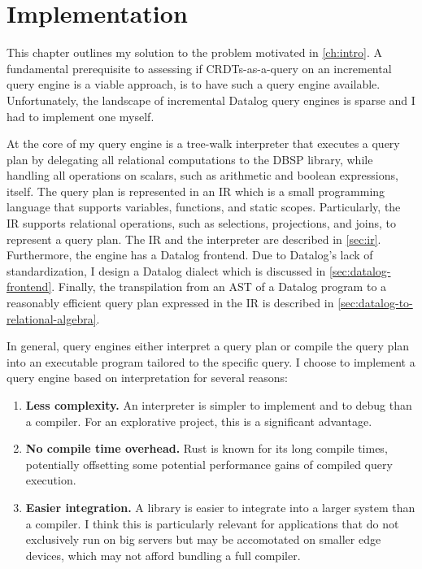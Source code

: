 
\chapter{Implementation}\label{ch:implementation}

This chapter outlines my solution to the problem motivated in \ref{ch:intro}.
A fundamental prerequisite to assessing if \acp{CRDT}-as-a-query on an
incremental query engine is a viable approach, is to have such a query
engine available.
Unfortunately, the landscape of incremental Datalog query engines is sparse
and I had to implement one myself.

At the core of my query engine is a tree-walk interpreter that executes a
query plan by delegating all relational computations to the DBSP library,
while handling all operations on scalars, such as arithmetic and boolean
expressions, itself.
The query plan is represented in an \acf{IR} which is a small programming
language that supports variables, functions, and static scopes.
Particularly, the \ac{IR} supports relational operations,
such as selections, projections, and joins, to represent a query plan.
The \ac{IR} and the interpreter are described in \ref{sec:ir}.
Furthermore, the engine has a Datalog frontend.
Due to Datalog's lack of standardization, I design a Datalog dialect which is
discussed in \ref{sec:datalog-frontend}.
Finally, the transpilation from an \ac{AST} of a Datalog program to a reasonably
efficient query plan expressed in the \ac{IR} is described
in \ref{sec:datalog-to-relational-algebra}.

In general, query engines either interpret a query plan or compile the query
plan into an executable program tailored to the specific query.
I choose to implement a query engine based on interpretation for several
reasons:

\begin{enumerate}
	\item \textbf{Less complexity.}
	      An interpreter is simpler to implement and to debug than a compiler.
	      For an explorative project, this is a significant advantage.
	\item \textbf{No compile time overhead.}
	      Rust is known for its long compile times, potentially offsetting some
	      potential performance gains of compiled query execution.
	\item \textbf{Easier integration.}
	      A library is easier to integrate into a larger system than a compiler.
	      I think this is particularly relevant for applications that do not
	      exclusively run on big servers but may be accomotated on smaller
	      edge devices, which may not afford bundling a full compiler.
\end{enumerate}

